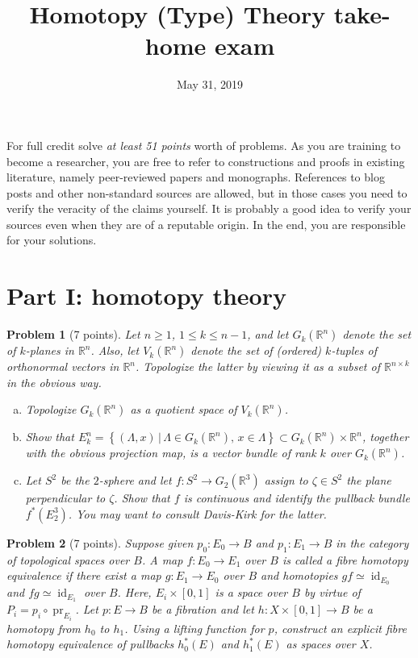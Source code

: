\documentclass[12pt]{article}
\newcommand\RR{\mathbb{R}}
\newcommand{\setof}[1]{\left\{#1\right\}}
\newcommand\lqs{\leqslant}
\newcommand\gqs{\geqslant}
\newcommand\id{\mathop{\mathrm{id}}\nolimits}
\newcommand\pr{\mathop{\mathrm{pr}}\nolimits}
\newtheorem{problem}{Problem}}
\begin{document}
\title{Homotopy (Type) Theory take-home exam}
\date{May 31, 2019}
\author{}
\maketitle

For full credit solve \emph{at least 51 points} worth of problems.
%
As you are training to become a researcher, you are free to refer to constructions and
proofs in existing literature, namely peer-reviewed papers and monographs. References to
blog posts and other non-standard sources are allowed, but in those cases you need to
verify the veracity of the claims yourself. It is probably a good idea to verify your
sources even when they are of a reputable origin. In the end, you are responsible for your
solutions.

\section*{Part I: homotopy theory}

\begin{problem}[7 points]
  Let $n\gqs 1$, $1\lqs k\lqs n-1$, and let $G_k(\RR^n)$ denote the set of $k$-planes in
  $\RR^n$. Also, let $V_k(\RR^n)$ denote the set of (ordered) $k$-tuples of orthonormal
  vectors in $\RR^n$. Topologize the latter by viewing it as a subset of $\RR^{n\times k}$
  in the obvious way.
  \begin{enumerate}[(a)]
  \item   Topologize $G_k(\RR^n)$ as a quotient space of $V_k(\RR^n)$.
  \item Show that
    $E_k^n=\setof{(\Lambda,x)\,\vert\,\Lambda\in
      G_k(\RR^n),\,x\in\Lambda}\subset G_k(\RR^n)\times\RR^n$,
    together with the obvious projection map, is a vector bundle of
    rank $k$ over $G_k(\RR^n)$.
  \item   Let $S^2$ be the $2$-sphere and let $f\colon S^2\to G_2(\RR^3)$ assign to $\zeta\in S^2$
    the plane perpendicular to $\zeta$. Show that $f$ is continuous and identify the pullback
    bundle $f^*(E_2^3)$. You may want to consult Davis-Kirk \cite{d-k} for the latter.
  \end{enumerate}
\end{problem}

\begin{problem}[7 points]
  Suppose given $p_0\colon E_0\to B$ and $p_1\colon E_1\to B$ in the category of
  topological spaces over $B$. A map $f\colon E_0\to E_1$ over $B$ is called a {\it fibre
    homotopy equivalence} if there exist a map $g\colon E_1\to E_0$ over $B$ and
  homotopies $gf\simeq\id_{E_0}$ and $fg\simeq\id_{E_1}$ over $B$. Here, $E_i\times[0,1]$
  is a space over $B$ by virtue of $P_i=p_i\circ\pr_{E_i}$. Let $p\colon E\to B$ be a
  fibration and let $h\colon X\times[0,1]\to B$ be a homotopy from $h_0$ to $h_1$. Using a
  lifting function for $p$, construct an explicit fibre homotopy equivalence of pullbacks
  $h_0^*(E)$ and $h_1^*(E)$ as spaces over $X$.
\end{problem}
  
\end{document}
